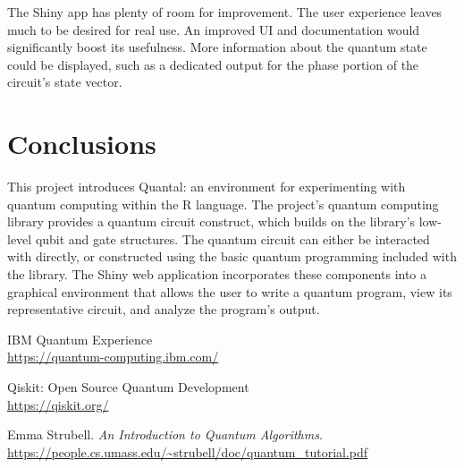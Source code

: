 \documentclass{article}
\begin{document}
The Shiny app has plenty of room for improvement. The user experience leaves much to be desired for real use. An improved UI and documentation would significantly boost its usefulness. More information about the quantum state could be displayed, such as a dedicated output for the phase portion of the circuit's state vector.


\section{Conclusions}
This project introduces Quantal: an environment for experimenting with quantum computing within the R language. The project's quantum computing library provides a quantum circuit construct, which builds on the library's low-level qubit and gate structures. The quantum circuit can either be interacted with directly, or constructed using the basic quantum programming included with the library. The Shiny web application incorporates these components into a graphical environment that allows the user to write a quantum program, view its representative circuit, and analyze the program's output.


\begin{thebibliography}{9}
IBM Quantum Experience
\\\url{https://quantum-computing.ibm.com/}

Qiskit: Open Source Quantum Development
\\\url{https://qiskit.org/}

Emma Strubell.
\textit{An Introduction to Quantum Algorithms}.
\\\url{https://people.cs.umass.edu/~strubell/doc/quantum_tutorial.pdf}
\end{thebibliography}
\end{document}
